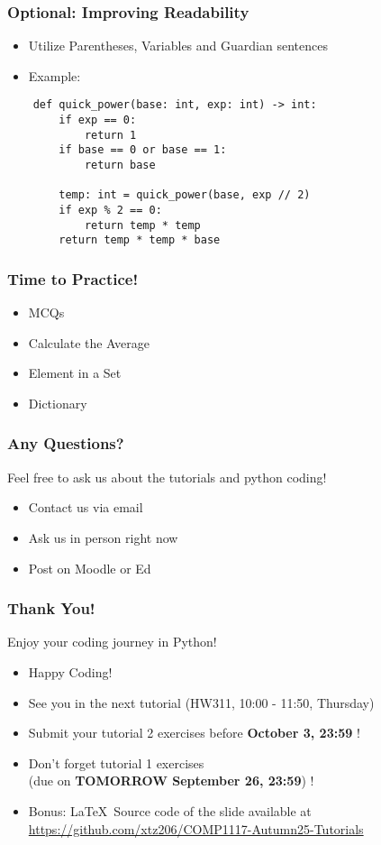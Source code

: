 \documentclass{beamer}
\begin{document}
\begin{frame}[fragile]
    \frametitle{Optional: Improving Readability}
    \begin{itemize}
        \item Utilize Parentheses, Variables and Guardian sentences
        \item Example:
    \end{itemize}

    \begin{verbatim}
    def quick_power(base: int, exp: int) -> int:
        if exp == 0:
            return 1
        if base == 0 or base == 1:
            return base

        temp: int = quick_power(base, exp // 2)
        if exp % 2 == 0:
            return temp * temp
        return temp * temp * base
    \end{verbatim}
\end{frame}

\begin{frame}
    \frametitle{Time to Practice!}
    \begin{itemize}
        \item MCQs
        \item Calculate the Average
        \item Element in a Set
        \item Dictionary
    \end{itemize}
\end{frame}

\begin{frame}
    \frametitle{Any Questions?}

    Feel free to ask us about the tutorials and python coding!

    \begin{itemize}
        \item Contact us via email
        \item Ask us in person right now
        \item Post on Moodle or Ed
    \end{itemize}
\end{frame}

\begin{frame}
    \frametitle{Thank You!}

    Enjoy your coding journey in Python!

    \begin{itemize}
        \item Happy Coding!
        \item See you in the next tutorial (HW311, 10:00 - 11:50, Thursday)
        \item Submit your tutorial 2 exercises before \textbf{October 3, 23:59} !
        \item Don't forget tutorial 1 exercises\\
              (due on \textbf{TOMORROW September 26, 23:59}) !
        \item Bonus: \LaTeX \  Source code of the slide available at
              \href{https://github.com/xtz206/COMP1117-Autumn25-Tutorials}{https://github.com/xtz206/COMP1117-Autumn25-Tutorials}
    \end{itemize}
\end{frame}
\end{document}
